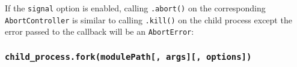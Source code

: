 If the \texttt{signal} option is enabled, calling \texttt{.abort()} on
the corresponding \texttt{AbortController} is similar to calling
\texttt{.kill()} on the child process except the error passed to the
callback will be an \texttt{AbortError}:

\begin{Shaded}
\begin{Highlighting}[]
\OperatorTok{=} \NormalTok{(}\NormalTok{)}\OperatorTok{;}
\OperatorTok{=}  \NormalTok{()}\OperatorTok{;}
\OperatorTok{=}\OperatorTok{;}
\OperatorTok{=} \NormalTok{(}\OperatorTok{,}\NormalTok{ [}\NormalTok{]}\OperatorTok{,}\OperatorTok{,}\KeywordTok{=\textgreater{}}\NormalTok{ \{}
  \OperatorTok{;} 
\NormalTok{\})}\OperatorTok{;}
\NormalTok{()}\OperatorTok{;}
\end{Highlighting}
\end{Shaded}

\subsubsection{\texorpdfstring{\texttt{child\_process.fork(modulePath{[},\ args{]}{[},\ options{]})}}{child\_process.fork(modulePath{[}, args{]}{[}, options{]})}}\label{child_process.forkmodulepath-args-options}


